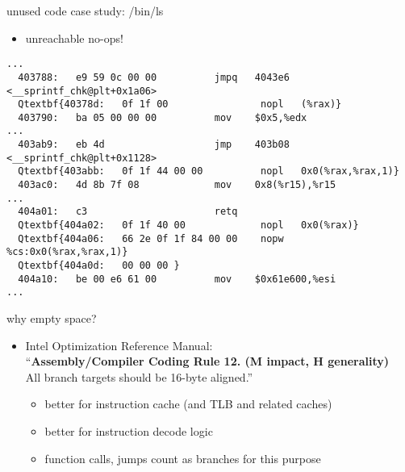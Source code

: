 \begin{frame}[fragile,label=lsStudy1]{unused code case study: /bin/ls}
    \begin{itemize}
    \item unreachable no-ops!
    \end{itemize}
\begin{Verbatim}[fontsize=\fontsize{9}{10}\selectfont,commandchars=Q\{\}]
...
  403788:	e9 59 0c 00 00       	jmpq   4043e6 <__sprintf_chk@plt+0x1a06>
  Qtextbf{40378d:	0f 1f 00             	nopl   (%rax)}
  403790:	ba 05 00 00 00       	mov    $0x5,%edx
...
  403ab9:	eb 4d                	jmp    403b08 <__sprintf_chk@plt+0x1128>
  Qtextbf{403abb:	0f 1f 44 00 00       	nopl   0x0(%rax,%rax,1)}
  403ac0:	4d 8b 7f 08          	mov    0x8(%r15),%r15
...
  404a01:	c3                   	retq   
  Qtextbf{404a02:	0f 1f 40 00          	nopl   0x0(%rax)}
  Qtextbf{404a06:	66 2e 0f 1f 84 00 00 	nopw   %cs:0x0(%rax,%rax,1)}
  Qtextbf{404a0d:	00 00 00 }
  404a10:	be 00 e6 61 00       	mov    $0x61e600,%esi
...
\end{Verbatim}
\end{frame}

\begin{frame}{why empty space?}
\begin{itemize}
\item Intel Optimization Reference Manual: \\
``\textbf{Assembly/Compiler Coding Rule 12. (M impact, H generality)} \\ All branch targets should be 16-byte aligned.''
\begin{itemize}
    \item better for instruction cache {\small (and TLB and related caches)}
    \item better for instruction decode logic
    \item function calls, jumps count as branches for this purpose
\end{itemize}
\end{itemize}
\end{frame}


